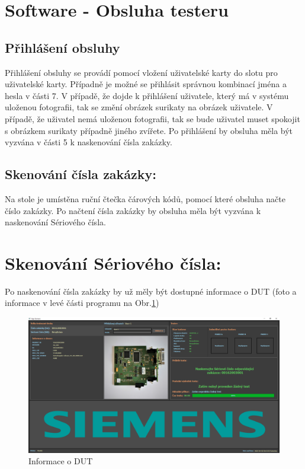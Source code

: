 \clearpage

\section{Software - Obsluha testeru}

\subsection{Přihlášení obsluhy}
Přihlášení obsluhy se provádí pomocí vložení uživatelské karty do slotu pro uživatelské karty. Případně je možné
se přihlásit správnou kombinací jména a hesla v části 7.
V případě, že dojde k přihlášení uživatele, který má v systému uloženou fotografii, tak se změní obrázek surikaty
na obrázek uživatele. V případě, že uživatel nemá uloženou fotografii, tak se bude uživatel muset spokojit
s obrázkem surikaty případně jiného zvířete. 
Po přihlášení by obsluha měla být vyzvána v části 5 k naskenování čísla zakázky.

\subsection{Skenování čísla zakázky:}
Na stole je umístěna ruční čtečka čárových kódů, pomocí které obsluha načte číslo zakázky.
Po načtení čísla zakázky by obsluha měla být vyzvána k naskenování Sériového čísla.

\section{Skenování Sériového čísla:}
Po naskenování čísla zakázky by už měly být dostupné informace o DUT
(foto a informace v levé části programu na Obr.\ref{fig: informace o DUT})
\begin{figure}[ht!]
	\centering
	\includegraphics[width = 1\textwidth]{obrazky/SCAN_SN.PNG}
    \caption{Informace o DUT}
    \label{fig: informace o DUT}
\end{figure}

